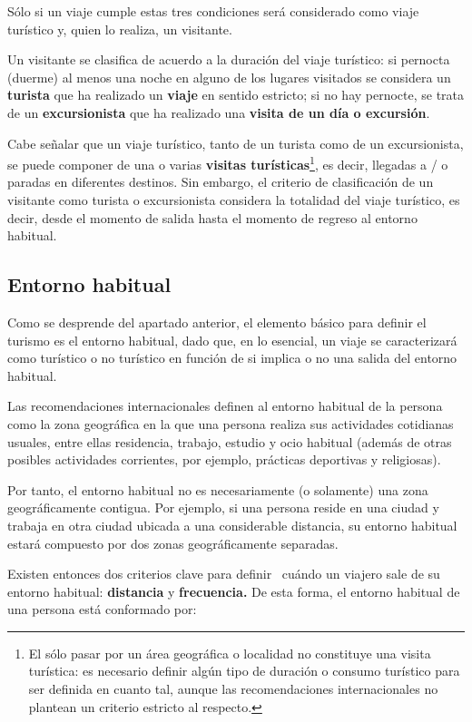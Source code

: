 \documentclass[
]{book}
\begin{document}
Sólo si un viaje cumple estas tres condiciones será considerado como viaje turístico y, quien lo realiza, un visitante.

Un visitante se clasifica de acuerdo a la duración del viaje turístico: si pernocta (duerme) al menos una noche en alguno de los lugares visitados se considera un \textbf{turista} que ha realizado un \textbf{viaje} en sentido estricto; si no hay pernocte, se trata de un \textbf{excursionista} que ha realizado una \textbf{visita de un día o excursión}.

Cabe señalar que un viaje turístico, tanto de un turista como de un excursionista, se puede componer de una o varias \textbf{visitas turísticas}\footnote{El sólo pasar por un área geográfica o localidad no constituye una visita turística: es necesario definir algún tipo de duración o consumo turístico para ser definida en cuanto tal, aunque las recomendaciones internacionales no plantean un criterio estricto al respecto.}, es decir, llegadas a / o paradas en diferentes destinos. Sin embargo, el criterio de clasificación de un visitante como turista o excursionista considera la totalidad del viaje turístico, es decir, desde el momento de salida hasta el momento de regreso al entorno habitual.

\hypertarget{entorno-habitual}{%
\subsection{Entorno habitual}\label{entorno-habitual}}

Como se desprende del apartado anterior, el elemento básico para definir el turismo es el entorno habitual, dado que, en lo esencial, un viaje se caracterizará como turístico o no turístico en función de si implica o no una salida del entorno habitual.

Las recomendaciones internacionales definen al entorno habitual de la persona como la zona geográfica en la que una persona realiza sus actividades cotidianas usuales, entre ellas residencia, trabajo, estudio y ocio habitual (además de otras posibles actividades corrientes, por ejemplo, prácticas deportivas y religiosas).~

Por tanto, el entorno habitual no es necesariamente (o solamente) una zona geográficamente contigua. Por ejemplo, si una persona reside en una ciudad y trabaja en otra ciudad ubicada a una considerable distancia, su entorno habitual estará compuesto por dos zonas geográficamente separadas.~

Existen entonces dos criterios clave para definir~ cuándo un viajero sale de su entorno habitual: \textbf{distancia} y \textbf{frecuencia.} De esta forma, el entorno habitual de una persona está conformado por:
\end{document}
